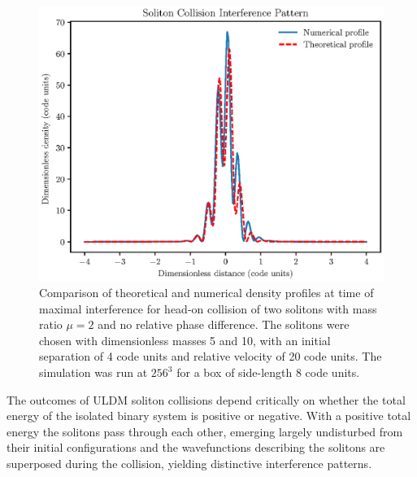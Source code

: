 \documentclass[a4paper,11pt]{article}
\begin{document}
\begin{figure}
  \includegraphics[trim={0 0 0 0.9cm},clip, scale=0.9]{interference_patterns}
  \caption{Comparison of theoretical and numerical density profiles at time of maximal interference for head-on collision of two solitons with mass ratio $\mu=2$ and no relative phase difference. The solitons were chosen with dimensionless masses 5 and 10, with an initial separation of 4 code units and relative velocity of 20 code units. The simulation was run at $256^3$ for a box of side-length 8 code units.}
  \label{fig:interference}
\end{figure}



The outcomes of ULDM soliton collisions depend critically on  whether the total energy of the isolated binary system is positive or negative. With a positive total energy the solitons pass through each other, emerging largely undisturbed from their initial configurations and the wavefunctions describing the solitons are superposed during the collision, yielding distinctive interference patterns. 
\end{document}
